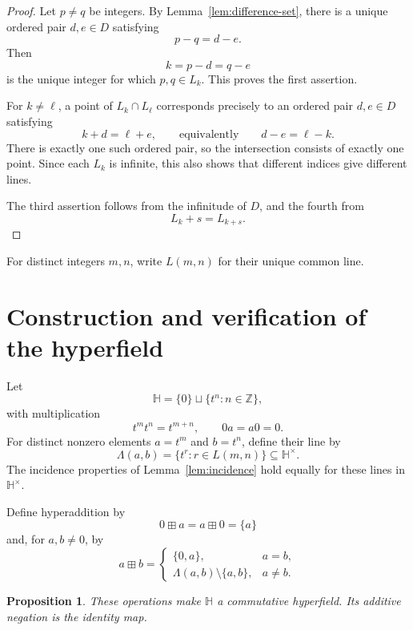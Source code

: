 \documentclass[11pt]{article}
\newcommand{\ZZ}{\mathbb{Z}}
\newcommand{\HH}{\mathbb{H}}
\newtheorem{proposition}[theorem]{Proposition}
\begin{document}
\begin{proof}
Let \(p\neq q\) be integers. By Lemma~\ref{lem:difference-set}, there is a
unique ordered pair \(d,e\in D\) satisfying
\[
    p-q=d-e.
\]
Then
\[
    k=p-d=q-e
\]
is the unique integer for which \(p,q\in L_k\). This proves the first
assertion.

For \(k\neq \ell\), a point of \(L_k\cap L_\ell\) corresponds precisely to
an ordered pair \(d,e\in D\) satisfying
\[
    k+d=\ell+e,
    \qquad\text{equivalently}\qquad
    d-e=\ell-k.
\]
There is exactly one such ordered pair, so the intersection consists of
exactly one point. Since each \(L_k\) is infinite, this also shows that
different indices give different lines.

The third assertion follows from the infinitude of \(D\), and the fourth
from
\[
    L_k+s=L_{k+s}.
\]
\end{proof}

For distinct integers \(m,n\), write \(L(m,n)\) for their unique common
line.

\section{Construction and verification of the hyperfield}

Let
\[
    \HH=\{0\}\sqcup\{t^n:n\in\ZZ\},
\]
with multiplication
\[
    t^m t^n=t^{m+n},\qquad 0a=a0=0.
\]
For distinct nonzero elements \(a=t^m\) and \(b=t^n\), define their line by
\[
    \Lambda(a,b)=\{t^r:r\in L(m,n)\}\subseteq\HH^\times.
\]
The incidence properties of Lemma~\ref{lem:incidence} hold equally for these
lines in \(\HH^\times\).

Define hyperaddition by
\[
    0\boxplus a=a\boxplus 0=\{a\}
\]
and, for \(a,b\neq 0\), by
\begin{equation}\label{eq:addition}
    a\boxplus b=
    \begin{cases}
        \{0,a\},&a=b,\\[2mm]
        \Lambda(a,b)\setminus\{a,b\},&a\neq b.
    \end{cases}
\end{equation}

\begin{proposition}\label{prop:hyperfield}
These operations make \(\HH\) a commutative hyperfield. Its additive
negation is the identity map.
\end{proposition}
\end{document}
